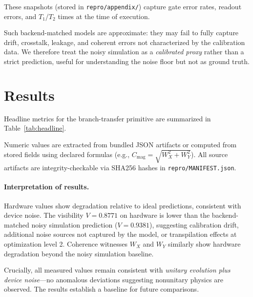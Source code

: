 \documentclass[11pt]{article}
\begin{document}
These snapshots (stored in \texttt{repro/appendix/}) capture gate error rates, readout errors, and $T_1$/$T_2$ times at the time of execution.
\vspace{0.5em}

Such backend-matched models are approximate: they may fail to fully capture drift, crosstalk, leakage, and coherent errors not characterized by the calibration data. We therefore treat the noisy simulation as a \emph{calibrated proxy} rather than a strict prediction, useful for understanding the noise floor but not as ground truth.

\section{Results}

Headline metrics for the branch-transfer primitive are summarized in Table~\ref{tab:headline}.

\label{sec:results}

Numeric values are extracted from bundled JSON artifacts or computed from stored fields using declared formulas (e.g., $C_\mathrm{mag} = \sqrt{W_X^2 + W_Y^2}$). All source artifacts are integrity-checkable via SHA256 hashes in \texttt{repro/MANIFEST.json}.



\paragraph{Interpretation of results.}
Hardware values show degradation relative to ideal predictions, consistent with device noise. The visibility $V = 0.8771$ on hardware is lower than the backend-matched noisy simulation prediction ($V = 0.9381$), suggesting calibration drift, additional noise sources not captured by the model, or transpilation effects at optimization level 2. Coherence witnesses $W_X$ and $W_Y$ similarly show hardware degradation beyond the noisy simulation baseline.

Crucially, all measured values remain consistent with \emph{unitary evolution plus device noise}---no anomalous deviations suggesting nonunitary physics are observed. The results establish a baseline for future comparisons.
\end{document}
